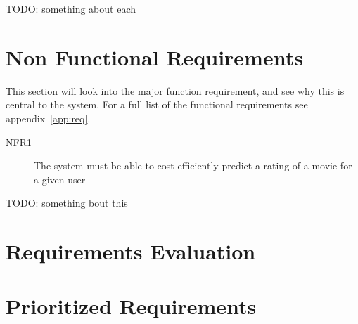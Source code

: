 TODO: something about each



\section{Non Functional Requirements}
This section will look into the major function requirement, and see why this is central to the system. For a full list of the functional requirements see appendix~\ref{app:req}.
\begin{description}
  \item[NFR1] The system must be able to cost efficiently predict a rating of a movie for a given user
\end{description}

TODO: something bout this



\section{Requirements Evaluation}



\section{Prioritized Requirements}

